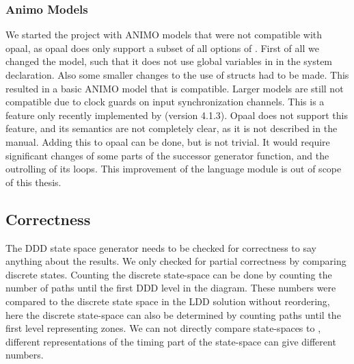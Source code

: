 \subsubsection{Animo Models}
We started the project with ANIMO models that were not compatible with opaal, as opaal does only support a subset of all options of \uppaal{}. First of all we changed the model, such that it does not use global variables in in the system declaration. Also some smaller changes to the use of structs had to be made. This resulted in a basic ANIMO model that is compatible. Larger models are still not compatible due to clock guards on input synchronization channels. This is a feature only recently implemented by \uppaal{} (version 4.1.3). Opaal does not support this feature, and its semantics are not completely clear, as it is not described in the manual. Adding this to opaal can be done, but is not trivial. It would require significant changes of some parts of the successor generator function, and the outrolling of its loops. This improvement of the language module is out of scope of this thesis.  

\subsection{Correctness}
The DDD state space generator needs to be checked for correctness to say anything about the results. We only checked for partial correctness by comparing discrete states. Counting the discrete state-space can be done by counting the number of paths until the first DDD level in the diagram. These numbers were compared to the discrete state space in the LDD solution without reordering, here the discrete state-space can also be determined by counting paths until the first level representing zones. We can not directly compare state-spaces to \uppaal{}, different representations of the timing part of the state-space can give different numbers.
